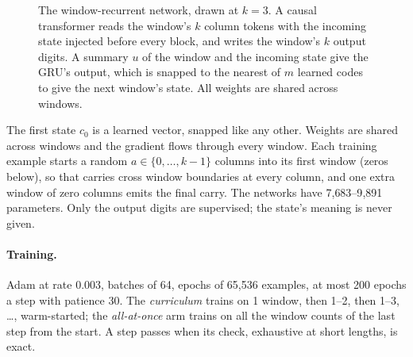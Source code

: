 \documentclass[11pt]{article}
\begin{document}
\begin{figure}[t]
\centering
{}
\caption{The window-recurrent network, drawn at $k = 3$. A causal transformer reads the window's
$k$ column tokens with the incoming state injected before every block, and writes the window's $k$
output digits. A summary $u$ of the window and the incoming state give the GRU's output, which is
snapped to the nearest of $m$ learned codes to give the next window's state. All weights are shared
across windows.}
\label{fig:model}
\end{figure}

The first state $c_0$ is a learned vector, snapped like any other. Weights are shared across
windows and the gradient flows through every window. Each training example starts a random
$a \in \{0,\dots,k-1\}$ columns into its first window (zeros below), so that carries cross window
boundaries at every column, and one extra window of zero columns emits the final carry. The
networks have 7{,}683--9{,}891 parameters. Only the output digits are supervised; the state's
meaning is never given.

\paragraph{Training.} Adam \citep{kingma-2015-adam} at rate 0.003, batches of 64, epochs of
65{,}536 examples, at most 200 epochs a step with patience 30. The \emph{curriculum} trains on 1
window, then 1--2, then 1--3, \dots, warm-started; the \emph{all-at-once} arm trains on all the
window counts of the last step from the start. A step passes when its check, exhaustive at short
lengths, is exact.
\end{document}
